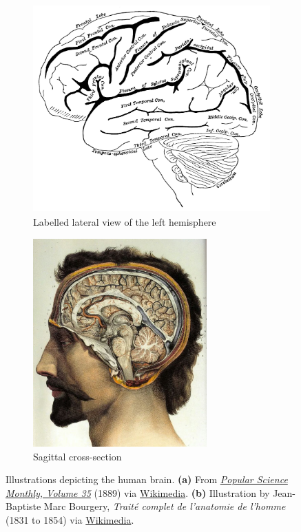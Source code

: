 \documentclass[10pt,letterpaper,oneside]{article}
\begin{document}
\begin{figure}
	\centering%
	\begin{subfigure}{0.575\textwidth}%
		\centering%
		\includegraphics[height=8cm]{media/psm_v35_d759_diagram_of_the_left_cerebral_hemisphere.jpg}%
		\caption{Labelled lateral view of the left hemisphere}%
		\label{fig:brain_lateral}%
	\end{subfigure}%
	\begin{subfigure}{0.425\textwidth}%
		\centering%
		\includegraphics[height=8cm]{media/jean_baptiste_marc_bourgery_atlas_of_anatomy_human_brain.jpg}%
		\caption{Sagittal cross-section}
		\label{fig:brain_sagittal}
	\end{subfigure}%
	\caption{Illustrations depicting the human brain. \textbf{(a)} From \href{https://archive.org/details/popularsciencemo35newyuoft/page/n6}{\emph{Popular Science Monthly, Volume 35}} (1889) via \href{https://commons.wikimedia.org/wiki/File:PSM_V35_D759_Diagram_of_the_left_cerebral_hemisphere.jpg}{Wikimedia}. \textbf{(b)} Illustration by Jean-Baptiste Marc Bourgery, \emph{Traité complet de l'anatomie de l'homme} (1831 to 1854) via \href{https://commons.wikimedia.org/wiki/File:Human_brain.jpg}{Wikimedia}.}
\end{figure}
\end{document}
